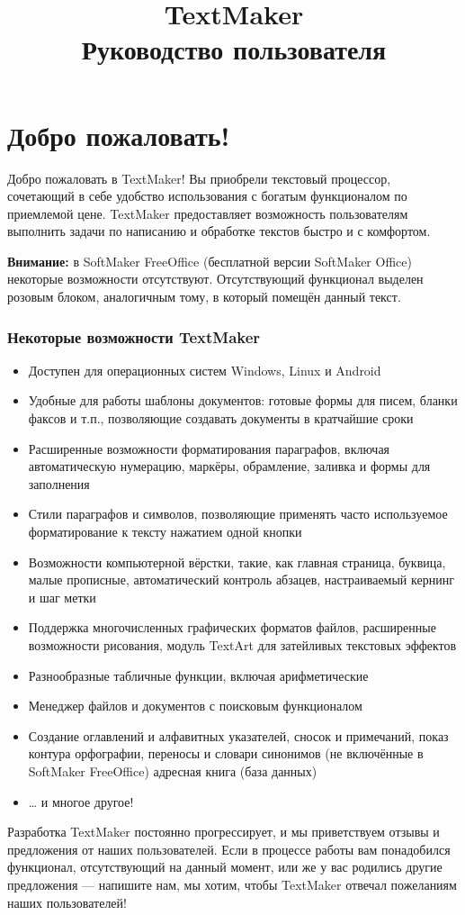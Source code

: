 \documentclass[a4paper,10pt]{article}
\title{TextMaker\\ Руководство пользователя}
\author{}
\date{}
\begin{document}
\maketitle
\tableofcontents
\section{Добро пожаловать!}

Добро пожаловать в TextMaker! Вы приобрели текстовый процессор, сочетающий в себе удобство использования с богатым функционалом по приемлемой цене. TextMaker предоставляет возможность пользователям выполнить задачи по написанию и обработке текстов быстро и с комфортом. 
\begin{mdframed}[backgroundcolor=pink!50]
\textbf{Внимание:} в SoftMaker FreeOffice (бесплатной версии SoftMaker Office) некоторые возможности отсутствуют. Отсутствующий функционал выделен розовым блоком, аналогичным тому, в который помещён данный текст.
\end{mdframed}
\subsubsection{Некоторые возможности TextMaker}
\begin{itemize}
\item Доступен для операционных систем Windows, Linux и Android
\item Удобные для работы шаблоны документов: готовые формы для писем, бланки факсов и т.п., позволяющие создавать документы в кратчайшие сроки
\item Расширенные возможности форматирования параграфов, включая автоматическую нумерацию, маркёры, обрамление, заливка и формы для заполнения
\item Стили параграфов и символов, позволяющие применять часто используемое форматирование к тексту нажатием одной кнопки
\item Возможности компьютерной вёрстки, такие, как главная страница, буквица, малые прописные, автоматический контроль абзацев, настраиваемый кернинг и шаг метки
\item Поддержка многочисленных графических форматов файлов, расширенные возможности рисования, модуль TextArt для затейливых текстовых эффектов
\item Разнообразные табличные функции, включая арифметические
\item Менеджер файлов и документов с поисковым функционалом
\item Создание оглавлений и алфавитных указателей, сносок и примечаний, показ контура
 орфографии, переносы и словари синонимов (не включённые в SoftMaker FreeOffice)
 адресная книга (база данных)
\item… и многое другое!
\end{itemize}
Разработка TextMaker постоянно прогрессирует, и мы приветствуем отзывы и предложения от наших пользователей. Если в процессе работы вам понадобился функционал, отсутствующий на данный момент, или же у вас родились другие предложения --- напишите нам, мы хотим, чтобы TextMaker отвечал пожеланиям наших пользователей!
\end{document}
